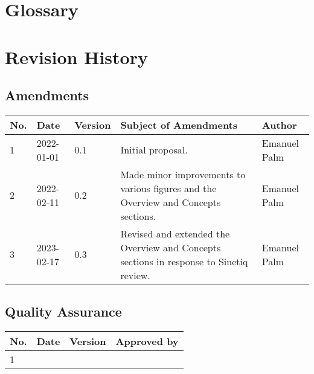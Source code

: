 \documentclass[a4paper]{arrowhead}
\begin{document}
\section{Glossary}
\label{sec:glossary}


\renewcommand{\bibsection}{\section{References}\label{sec:references}}



\newpage

\section{Revision History}
\label{sec:revision}

\subsection{Amendments}

\noindent\begin{tabularx}{\textwidth}{| p{1cm} | p{2cm} | p{1.25cm} | X | p{4cm} |} \hline
\rowcolor{gray!33} No. & Date & Version & Subject of Amendments & Author \\ \hline

1 & 2022-01-01 & 0.1 & Initial proposal. & Emanuel Palm \\ \hline
2 & 2022-02-11 & 0.2 & Made minor improvements to various figures and the Overview and Concepts sections. & Emanuel Palm \\ \hline
3 & 2023-02-17 & 0.3 & Revised and extended the Overview and Concepts sections in response to Sinetiq review. & Emanuel Palm \\ \hline

\end{tabularx}

\subsection{Quality Assurance}

\noindent\begin{tabularx}{\textwidth}{| p{1cm} | p{2cm} | p{1.25cm} | X |} \hline
\rowcolor{gray!33} No. & Date & Version & Approved by \\ \hline

1 & & & \\ \hline

\end{tabularx}
\end{document}
